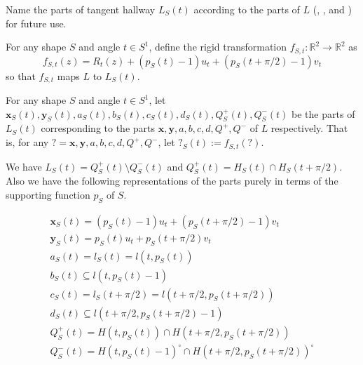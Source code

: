 Name the parts of tangent hallway \(L_S(t)\) according to the parts of \(L\) (, , and ) for future use.

\begin{definition}

For any shape \(S\) and angle \(t \in S^1\), define the rigid transformation \(f_{S, t} : \mathbb{R}^2 \to \mathbb{R}^2\) as
\[
f_{S, t}(z) = R_t(z) + (p_S(t) - 1)  u_t + (p_S(t + \pi/2) - 1) v_t
\]
so that \(f_{S, t}\) maps \(L\) to \(L_S(t)\).

\label{def:tangent-hallway-map}
\end{definition}

\begin{definition}

For any shape \(S\) and angle \(t \in S^1\), let \(\mathbf{x}_S(t), \mathbf{y}_S(t), a_S(t), b_S(t), c_S(t), d_S(t), Q^+_S(t), Q^-_S(t)\) be the parts of \(L_S(t)\) corresponding to the parts \(\mathbf{x}, \mathbf{y}, a, b, c, d, Q^+, Q^-\) of \(L\) respectively. That is, for any \(? = \mathbf{x}, \mathbf{y}, a, b, c, d, Q^+, Q^-\), let \(?_S(t) := f_{S, t}(?)\).

\label{def:rotating-hallway-parts}
\end{definition}

\begin{proposition}

We have \(L_S(t) = Q_S^+(t) \setminus Q_S^-(t)\) and \(Q^+_S(t) = H_S(t) \cap H_S(t + \pi/2)\). Also we have the following representations of the parts purely in terms of the supporting function \(p_S\) of \(S\).

\begin{gather*}
\mathbf{x}_S(t) = (p_S(t) - 1) u_t + (p_S(t + \pi/2) - 1) v_t \\
\mathbf{y}_S(t) = p_S(t) u_t + p_S(t + \pi/2) v_t \\
a_S(t) = l_S(t) = l(t, p_S(t)) \\
b_S(t) \subseteq l(t, p_S(t) - 1) \\
c_S(t) = l_S(t + \pi/2) = l(t + \pi/2, p_S(t + \pi/2)) \\
d_S(t) \subseteq l(t + \pi/2, p_S(t + \pi/2) - 1) \\
Q_S^+(t) = H(t, p_S(t)) \cap H(t + \pi/2, p_S(t + \pi/2)) \\
Q_S^-(t) = H(t, p_S(t) - 1)^{\circ} \cap H(t + \pi/2, p_S(t + \pi/2))^{\circ}
\end{gather*}

\label{pro:rotating-hallway-parts}
\end{proposition}


